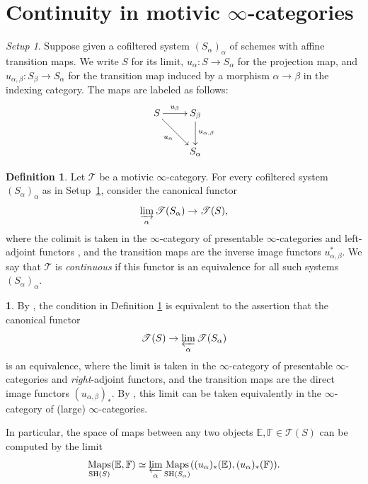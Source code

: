 \documentclass[11pt]{article}
\numberwithin{equation}{section}\renewcommand{\encodingdefault}{TU}
\newcommand{\T}{\mathscr T}
\newcommand{\E}{\mathbb E}
\newcommand{\F}{\mathbb F}
\DeclareMathOperator{\SH}{SH}
\DeclareMathOperator{\Maps}{Maps}
\DeclareMathOperator{\ilim}{\varinjlim}
\DeclareMathOperator{\plim}{\varprojlim}
\theoremstyle{remark}
\newtheorem{setup}[thm]{Setup}
\theoremstyle{definition}
\newtheorem{df}[thm]{Definition}
\newtheorem{num}[thm]{}
\numberwithin{equation}{thm}
\begin{document}
\appendix
\section{Continuity in motivic \texorpdfstring{$\infty$}{∞}-categories}
\label{apd:continuity}

\begin{setup}\label{setup:continuity}
Suppose given a cofiltered system $(S_\alpha)_\alpha$ of schemes with affine transition maps.
We write $S$ for its limit, $u_\alpha : S \to S_\alpha$ for the projection map, and $u_{\alpha,\beta} : S_\beta \to S_\alpha$ for the transition map induced by a morphism $\alpha \to \beta$ in the indexing category. The maps are labeled as follows:
\[
\xymatrix{
S \ar[r]^-{u_\beta}\ar[rd]_{u_\alpha}
& S_\beta \ar[d]^{u_{\alpha,\beta}}
\\
& S_\alpha
}
\]
\end{setup}

\begin{df}\label{df:continuity}
Let $\T$ be a motivic $\infty$-category.
For every cofiltered system $(S_\alpha)_\alpha$ as in Setup~\ref{setup:continuity}, consider the canonical functor
\[
\ilim_\alpha \T(S_\alpha) \to \T(S),
\]
where the colimit is taken in the $\infty$-category of presentable $\infty$-categories and left-adjoint functors \cite[Def.\,5.5.3.1]{LurieHTT}, and the transition maps are the inverse image functors $u_{\alpha,\beta}^*$.
We say that $\T$ is \emph{continuous} if this functor is an equivalence for all such systems $(S_\alpha)_\alpha$.
\end{df}

\begin{num}\label{num:continuity lower star}
By \cite[Cor.\,5.5.3.4]{LurieHTT}, the condition in Definition \ref{df:continuity} is equivalent to the assertion that the canonical functor
\[
\T(S) \to \plim_\alpha \T(S_\alpha)
\]
is an equivalence, where the limit is taken in the $\infty$-category of presentable $\infty$-categories and \emph{right}-adjoint functors, and the transition maps are the direct image functors $(u_{\alpha,\beta})_*$.
By \cite[Th.\,5.5.3.18]{LurieHTT}, this limit can be taken equivalently in the $\infty$-category of (large) $\infty$-categories.

In particular, the space of maps between any two objects $\E,\F \in \T(S)$ can be computed by the limit
\[
\Maps_{\SH(S)}(\E, \F)
\simeq \plim_\alpha \Maps_{\SH(S_\alpha)}((u_\alpha)_*(\E), (u_\alpha)_*(\F)).
\]
\end{num}
\end{document}
